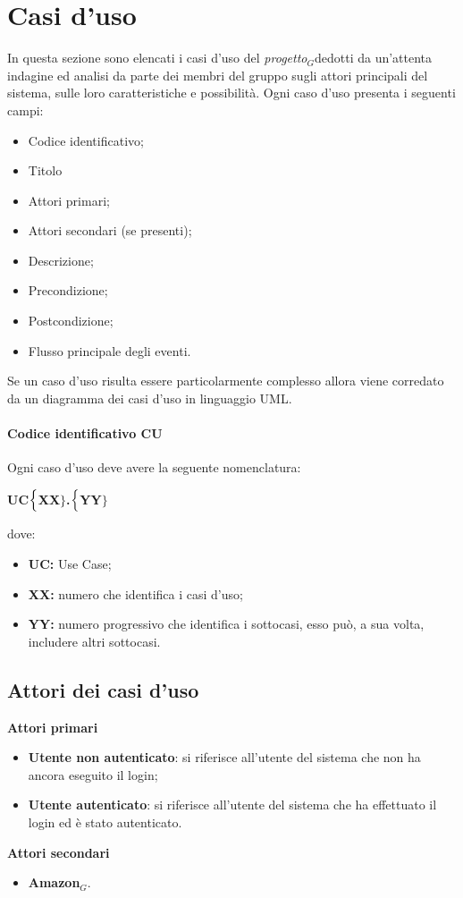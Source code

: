 \chapter{Casi d'uso} \label{CasiD'Uso}
In questa sezione sono elencati i casi d'uso del \textit{progetto$_{G}$}dedotti da un'attenta indagine ed analisi da parte dei membri del gruppo sugli attori principali del sistema, sulle loro caratteristiche e possibilità.
Ogni caso d'uso presenta i seguenti campi:
\begin{itemize}
	\item Codice identificativo;
	\item Titolo
	\item Attori primari;
	\item Attori secondari (se presenti);
	\item Descrizione;
	\item Precondizione;
	\item Postcondizione;
	\item Flusso principale degli eventi.
\end{itemize}
Se un caso d'uso risulta essere particolarmente complesso allora viene corredato da un diagramma dei casi d'uso in linguaggio UML.
\subsubsection{Codice identificativo CU}
Ogni caso d'uso deve avere la seguente nomenclatura:
\begin{center}
	\textbf{UC$\Bigl\{$XX$\Bigr\}$.$\Bigl\{$YY$\Bigr\}$}
\end{center}
dove:
\begin{itemize}
	\item \textbf{UC:} Use Case;
	\item \textbf{{XX}:} numero che identifica i casi d'uso;
	\item \textbf{{YY}:} numero progressivo che identifica i sottocasi, esso può, a sua volta, includere altri sottocasi.
\end{itemize}

\section{Attori dei casi d'uso}
\textbf{Attori primari}
\begin{itemize}
	\item \textbf{Utente non autenticato}: si riferisce all'utente del sistema che non ha ancora eseguito il login;
	\item \textbf{Utente autenticato}: si riferisce all'utente del sistema che ha effettuato il login ed è stato autenticato.
\end{itemize}
\textbf{Attori secondari}
\begin{itemize}
	\item \textbf{Amazon$_{G}$}.
\end{itemize}

